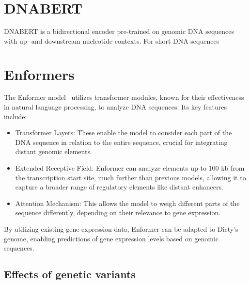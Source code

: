\documentclass{article}
\begin{document}
\section{DNABERT}
DNABERT is a bidirectional encoder pre-trained on genomic DNA sequences with up- and downstream nucleotide contexts.
For short DNA sequences


\section{Enformers}
The Enformer model~\cite{avsec_effective_2021} utilizes transformer modules, known for their effectiveness in natural language processing, to analyze DNA sequences. Its key features include:
\begin{itemize}
    \item Transformer Layers: These enable the model to consider each part of the DNA sequence in relation to the entire sequence, crucial for integrating distant genomic elements.
    \item Extended Receptive Field: Enformer can analyze elements up to 100 kb from the transcription start site, much further than previous models, allowing it to capture a broader range of regulatory elements like distant enhancers.
    \item Attention Mechanism: This allows the model to weigh different parts of the sequence differently, depending on their relevance to gene expression.
\end{itemize}
By utilizing existing gene expression data, Enformer can be adapted to Dicty's genome, enabling predictions of gene expression levels based on genomic sequences.

\subsection{Effects of genetic variants}
\end{document}
